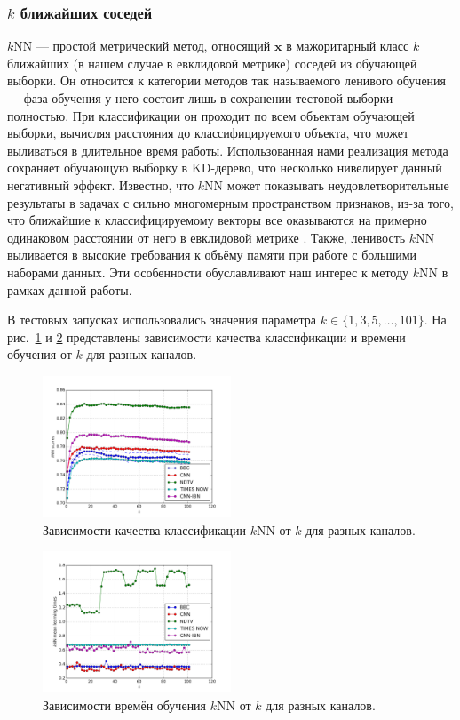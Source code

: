 \subsubsection{\(k\) ближайших соседей}
\(k\)NN --- простой метрический метод, относящий \(\mathbf{x}\) в мажоритарный класс \(k\) ближайших (в нашем случае в евклидовой метрике) соседей из обучающей выборки. Он относится к категории методов так называемого ленивого обучения --- фаза обучения у него состоит лишь в сохранении тестовой выборки полностью. При классификации он проходит по всем объектам обучающей выборки, вычисляя расстояния до классифицируемого объекта, что может выливаться в длительное время работы. Использованная нами реализация метода сохраняет обучающую выборку в KD-дерево, что несколько нивелирует данный негативный эффект. Известно, что \(k\)NN может показывать неудовлетворительные результаты в задачах с сильно многомерным пространством признаков, из-за того, что ближайшие к классифицируемому векторы все оказываются на примерно одинаковом расстоянии от него в евклидовой метрике \cite{beyer}. Также, ленивость \(k\)NN выливается в высокие требования к объёму памяти при работе с большими наборами данных. Эти особенности обуславливают наш интерес к методу \(k\)NN в рамках данной работы.

В тестовых запусках использовались значения параметра \(k\in\{1,3,5,\dotsc,101\}\). На рис.~\ref{fig:knn-base-scores} и \ref{fig:knn-base-times} представлены зависимости качества классификации и времени обучения от \(k\) для разных каналов.
\begin{figure}[h!]
    \centering
    \includegraphics[width=0.5\textwidth]{images/knn-scores.png}
    \caption{Зависимости качества классификации \(k\)NN от \(k\) для разных каналов.}
    \label{fig:knn-base-scores}
\end{figure}
\begin{figure}[h!]
    \centering
    \includegraphics[width=0.5\textwidth]{images/knn-times.png}
    \caption{Зависимости времён обучения \(k\)NN от \(k\) для разных каналов.}
    \label{fig:knn-base-times}
\end{figure}

